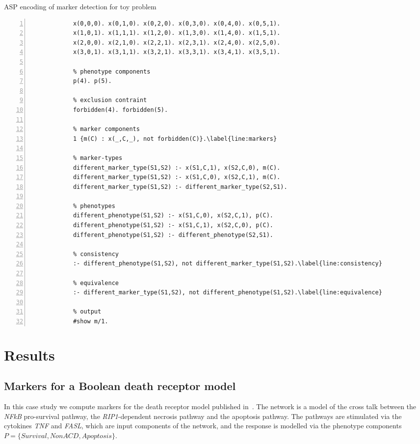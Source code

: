 \documentclass[11pt]{article}
\begin{document}
    \begin{table}
        \caption{ASP encoding of marker detection for toy problem}
        \label{tab:toy_asp_encoding}

        \begin{Verbatim}[gobble=9,numbers=left,xleftmargin=5mm,commandchars=\\\{\},fontsize=\small]
            % steady states
            x(0,0,0). x(0,1,0). x(0,2,0). x(0,3,0). x(0,4,0). x(0,5,1).
            x(1,0,1). x(1,1,1). x(1,2,0). x(1,3,0). x(1,4,0). x(1,5,1).
            x(2,0,0). x(2,1,0). x(2,2,1). x(2,3,1). x(2,4,0). x(2,5,0).
            x(3,0,1). x(3,1,1). x(3,2,1). x(3,3,1). x(3,4,1). x(3,5,1).

            % phenotype components
            p(4). p(5).

            % exclusion contraint
            forbidden(4). forbidden(5).

            % marker components
            1 {m(C) : x(_,C,_), not forbidden(C)}.\label{line:markers}

            % marker-types
            different_marker_type(S1,S2) :- x(S1,C,1), x(S2,C,0), m(C).
            different_marker_type(S1,S2) :- x(S1,C,0), x(S2,C,1), m(C).
            different_marker_type(S1,S2) :- different_marker_type(S2,S1).

            % phenotypes
            different_phenotype(S1,S2) :- x(S1,C,0), x(S2,C,1), p(C).
            different_phenotype(S1,S2) :- x(S1,C,1), x(S2,C,0), p(C).
            different_phenotype(S1,S2) :- different_phenotype(S2,S1).

            % consistency
            :- different_phenotype(S1,S2), not different_marker_type(S1,S2).\label{line:consistency}

            % equivalence
            :- different_marker_type(S1,S2), not different_phenotype(S1,S2).\label{line:equivalence}

            % output
            #show m/1.
        \end{Verbatim}
    \end{table}

    \section{Results}\label{sec:results}
    \subsection{Markers for a Boolean death receptor model}
    In this case study we compute markers for the death receptor model published in~\cite{calzone2010mathematical}.
    The network is a model of the cross talk between the \emph{NFkB} pro-survival pathway, the \emph{RIP1}-dependent necrosis pathway and the apoptosis pathway.
    The pathways are stimulated via the cytokines \emph{TNF} and \emph{FASL}, which are input components of the network, and the response is modelled via the phenotype components $P=\{Survival, NonACD, Apoptosis\}$.
\end{document}
